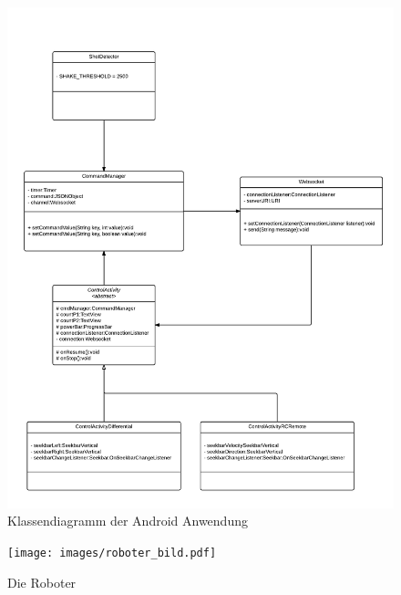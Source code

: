 \begin{figure}
	\includegraphics[width=\textwidth]{images/uml_android_app.pdf}
	\caption{Klassendiagramm der Android Anwendung}
	\label{fig:android_uml}
\end{figure}

\begin{figure}
	\texttt{[image: images/roboter\_bild.pdf]}
	\caption{Die Roboter}
	\label{fig:robot_pic}
\end{figure}